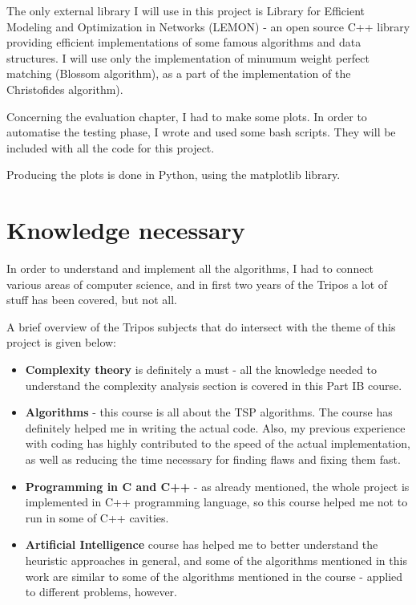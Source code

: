 \documentclass[12pt,twoside,notitlepage]{report}
\begin{document}
The only external library I will use in this project is Library for Efficient Modeling and Optimization in Networks (LEMON)\cite{Dezs__2011} - an open source C++ library providing efficient implementations of some famous algorithms and data structures. I will use only the implementation of minumum weight perfect matching (Blossom algorithm), as a part of the implementation of the Christofides algorithm).

Concerning the evaluation chapter, I had to make some plots. In order to automatise the testing phase, I wrote and used some bash scripts. They will be included with all the code for this project.

Producing the plots is done in Python, using the matplotlib library.

\section{Knowledge necessary}

In order to understand and implement all the algorithms, I had to connect various areas of computer science, and in first two years of the Tripos a lot of stuff has been covered, but not all.

A brief overview of the Tripos subjects that do intersect with the theme of this project is given below:

\begin{itemize}

\item {\bf Complexity theory} is definitely a must - all the knowledge needed to understand the complexity analysis section is covered in this Part IB course. 

\item {\bf Algorithms} - this course is all about the TSP algorithms. The course has definitely helped me in writing the actual code. Also, my previous experience with coding has highly contributed to the speed of the actual implementation, as well as reducing the time necessary for finding flaws and fixing them fast.

\item {\bf Programming in C and C++} - as already mentioned, the whole project is implemented in C++ programming language, so this course helped me not to run in some of C++ cavities.

\item {\bf Artificial Intelligence} course has helped me to better understand the heuristic approaches in general, and some of the algorithms mentioned in this work are similar to some of the algorithms mentioned in the course - applied to different problems, however.

\end{itemize}
\end{document}

